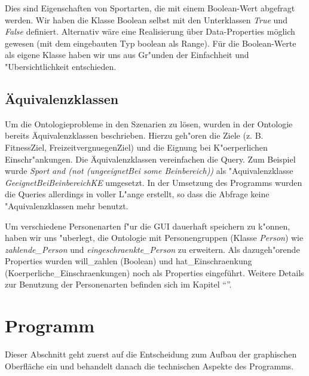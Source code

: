 Dies sind Eigenschaften von Sportarten, die mit einem Boolean-Wert abgefragt werden. Wir haben die Klasse Boolean selbst mit den Unterklassen \textit{True} und \textit{False} definiert. Alternativ w\"are eine Realisierung \"uber Data-Properties m\"oglich gewesen (mit dem eingebauten Typ boolean als Range). Für die Boolean-Werte als eigene Klasse haben wir uns aus Gr"unden der Einfachheit und "Ubersichtlichkeit entschieden. 

\subsection{\"Aquivalenzklassen}

Um die Ontologieprobleme in den Szenarien zu l\"osen, wurden in der Ontologie bereits \"Aquivalenzklassen beschrieben. 
Hierzu geh"oren die Ziele (z. B. FitnessZiel, FreizeitvergnuegenZiel) und die Eignung bei K"oerperlichen Einschr"ankungen.
Die Äquivalenzklassen vereinfachen die Query. Zum Beispiel wurde \textit{Sport and (not (ungeeignetBei some Beinbereich))} als "Aquivalenzklasse \textit{GeeignetBeiBeinbereichKE} umgesetzt. In der Umsetzung des Programms wurden die Queries allerdings in voller L"ange erstellt, so dass die Abfrage keine "Aquivalenzklassen mehr benutzt. 


Um verschiedene Personenarten f"ur die GUI dauerhaft speichern zu k"onnen, haben wir uns "uberlegt, die Ontologie mit Personengruppen (Klasse \textit{Person}) wie \textit{zahlende\_Person} und \textit{eingeschraenkte\_Person} zu erweitern. Als dazugeh"orende Properties wurden will\_zahlen (Boolean) und hat\_Einschraenkung (Koerperliche\_Einschraenkungen) noch als Properties eingeführt. Weitere Details zur Benutzung der Personenarten befinden sich im Kapitel "`"'.

\section{Programm}

Dieser Abschnitt geht zuerst auf die Entscheidung zum Aufbau der graphischen Oberfl\"ache ein und behandelt danach die technischen Aspekte des Programms. 

